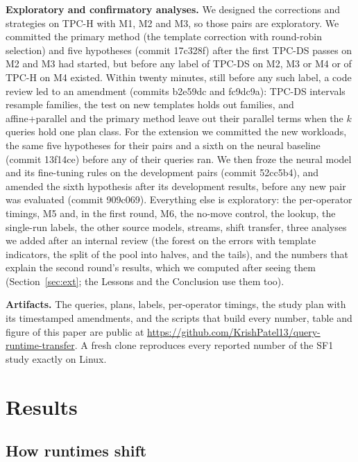 \documentclass[conference]{IEEEtran}
\begin{document}
\textbf{Exploratory and confirmatory analyses.} We designed the corrections
and strategies on TPC-H with M1, M2 and M3, so those pairs are exploratory.
We committed the primary method (the template correction with round-robin
selection) and five hypotheses (commit 17c328f) after the first TPC-DS
passes on M2 and M3 had started, but before any label of TPC-DS on M2, M3
or M4 or of TPC-H on M4 existed. Within twenty minutes, still before any
such label, a code review led to an amendment (commits b2e59dc and
fc9dc9a): TPC-DS intervals resample families, the test on new templates
holds out families, and affine+parallel and the primary method leave out
their parallel terms when the $k$ queries hold one plan class. For the
extension we committed the new workloads, the same five hypotheses for
their pairs and a sixth on the neural baseline (commit 13f14ce) before any
of their queries ran. We then froze the neural model and its fine-tuning
rules on the development pairs (commit 52cc5b4), and amended the sixth
hypothesis after its development results, before any new pair was
evaluated (commit 909c069). Everything else is exploratory: the
per-operator timings, M5 and, in the first round, M6, the no-move control, the lookup, the
single-run labels, the other source models, streams, shift transfer,
three analyses we added after an internal review (the forest on the errors
with template indicators, the split of the pool into halves, and the
tails), and the numbers that explain the second round's results, which we
computed after seeing them (Section~\ref{sec:ext}; the Lessons and the
Conclusion use them too).

\textbf{Artifacts.} The queries, plans, labels, per-operator timings, the
study plan with its timestamped amendments, and the scripts that build
every number, table and figure of this paper are public at
\url{https://github.com/KrishPatel13/query-runtime-transfer}. A fresh clone
reproduces every reported number of the SF1 study exactly on Linux.

\section{Results}
\label{sec:results}

\subsection{How runtimes shift}
\label{sec:shift}
\end{document}
